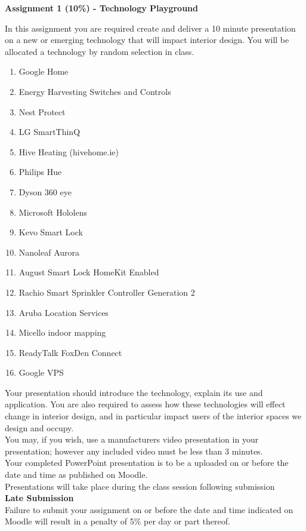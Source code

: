 
	
\begin{flushleft}
\Large\textbf{Assignment 1 (10\%) - Technology Playground}\\
\end{flushleft}

In this assignment you are required create and deliver a 10 minute presentation on a new or emerging technology that will impact interior design.  You will be allocated a technology by random selection in class.


\begin{enumerate}
	\item Google Home
	\item Energy Harvesting Switches and Controls
	\item Nest Protect
	\item LG SmartThinQ
	\item Hive Heating (hivehome.ie)
	\item Philips Hue
	\item Dyson 360 eye
	\item Microsoft Hololens
	\item Kevo Smart Lock
	\item Nanoleaf Aurora
	\item August Smart Lock HomeKit Enabled
	\item Rachio Smart Sprinkler Controller Generation 2
	\item Aruba Location Services
	\item Micello indoor mapping
	\item ReadyTalk FoxDen Connect
	\item Google VPS
\end{enumerate}

Your presentation should introduce the technology, explain its use and application.  You are also required to assess how these technologies will effect change in interior design, and in particular impact users of the interior spaces we design and occupy.\\

You may, if you wish, use a manufacturers video presentation in your presentation; however any included video must be less than 3 minutes.\\

Your completed PowerPoint presentation is to be a uploaded on or before the date and time as published on Moodle.\\

Presentations will take place during the class session following submission\\

\textbf{Late Submission}\\
Failure to submit your assignment on or before the date and time indicated on Moodle will result in a penalty of 5\% per day or part thereof.  

